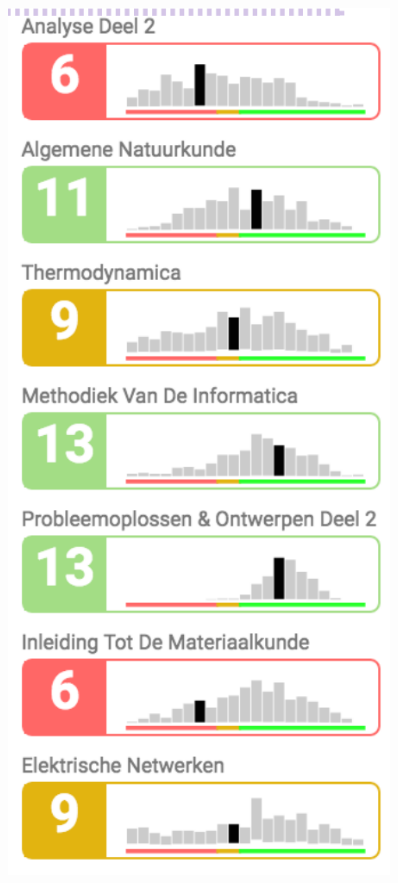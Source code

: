 \begin{figure}
    \begin{minipage}[b]{0.4\textwidth}
        \centering
        \includegraphics[width=0.9\textwidth]{figures/comp_exam.png}

\end{minipage}
\end{figure}
